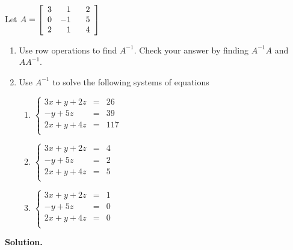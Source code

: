\begin{ex} \label{matrixinverseex} Let $A = \left[ \begin{array}{rrr} 3 & 1 & \hphantom{-}2 \\ 0 & -1 & 5 \\ 2 & 1 & 4 \\ \end{array} \right]$

\begin{enumerate}

\item  Use row operations to find $A^{-1}$.  Check your answer by finding $A^{-1}A$ and $AA^{-1}$.

\item  Use $A^{-1}$ to solve the following systems of equations

\begin{multicols}{3}

\begin{enumerate}

\item $\left\{ \begin{array}{rcl}   3x+y+2z & = & 26 \\-y+5z & = & 39 \\ 2x+y+4z&=& 117 \\ \end{array} \right.$

\item $\left\{ \begin{array}{rcl} 3x+y+2z & = & 4 \\-y+5z & = & 2 \\ 2x+y+4z&=& 5 \\ \end{array} \right.$

\item $\left\{ \begin{array}{rcl} 3x+y+2z & = & 1 \\-y+5z & = & 0 \\ 2x+y+4z&=& 0 \\ \end{array} \right.$

\end{enumerate}

\end{multicols}

\end{enumerate}

{\bf Solution.}  

\begin{enumerate}


\end{enumerate}
\end{ex}
